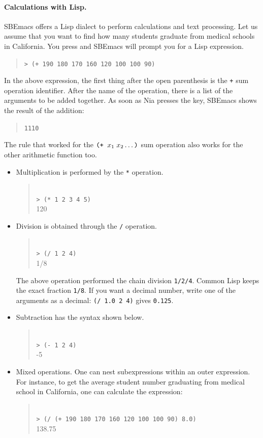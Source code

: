 \documentclass[a4paper,12pt,openany]{book}
\begin{document}
\paragraph{Calculations with Lisp.} SBEmacs
offers a Lisp dialect to perform calculations
and text processing. Let us assume that you
want to find how many students graduate
from medical schools in California. You
press \keys{:} and SBEmacs
will prompt you for a Lisp expression.
\begin{quote}
\verb|> (+ 190 180 170 160 120 100 100 90)|
\end{quote}
In the above expression, the first thing after
the open parenthesis is the \verb|+| sum
operation identifier. After the name of
the operation, there is a list of
the arguments to be added together.
As soon as Nia presses the  key,
SBEmacs shows the result of the addition:
\begin{quote}
\verb|1110|
\end{quote}
The rule that worked for
the $\verb|(+ | x_1\;x_2\ldots\verb|)|$
sum operation also works for the
other arithmetic function too.
\begin{itemize}
  \item{Multiplication} is performed
by the \verb|*| operation.
\begin{quote}
\keys{:}\\
\verb|> (* 1 2 3 4 5)|\\
120
\end{quote}
\item{Division} is obtained through the \verb|/| operation.
\begin{quote}
\keys{:}\\
\verb|> (/ 1 2 4)|\\
1/8
\end{quote}
The above operation performed the chain
division \verb|1/2/4|. Common Lisp keeps the exact
fraction \verb|1/8|. If you want a decimal number,
write one of the arguments as a decimal: \verb|(/ 1.0 2 4)|
gives \verb|0.125|.
\item{Subtraction} has the syntax shown below.
\begin{quote}
\keys{:}\\
\verb|> (- 1 2 4)|\\
-5
\end{quote}
\item Mixed operations. One can nest subexpressions
  within an outer expression. For instance,
  to get the average student number graduating
  from medical school in California, one can
  calculate the expression:
\begin{quote}
\keys{:}\\
\verb|> (/ (+ 190 180 170 160 120 100 100 90) 8.0)|\\
138.75
\end{quote}
\end{itemize}
\end{document}
